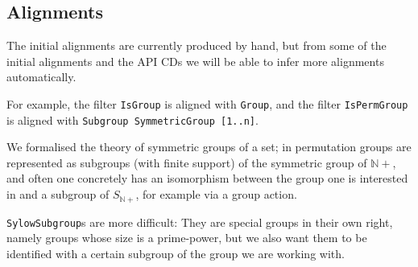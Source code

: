 \subsection{Alignments}

The initial alignments are currently produced by hand, but from some of the
initial alignments and the \GAP API CDs we will be able to infer more alignments
automatically.

For example, the filter \texttt{IsGroup} is aligned with \texttt{Group}, and the
filter \texttt{IsPermGroup} is aligned with \texttt{Subgroup SymmetricGroup
  [1..n]}.

We formalised the theory of symmetric groups of a set; in \GAP permutation groups
are represented as subgroups (with finite support) of the symmetric group of
$\mathbb{N}+$, and often one concretely has an isomorphism between the group one
is interested in and a subgroup of $S_{\mathbb{N}+}$, for example
via a group action.

\texttt{SylowSubgroup}s are more difficult: They are special groups in their
own right, namely groups whose size is a prime-power, but we also want them
to be identified with a certain subgroup of the group we are working
with.


